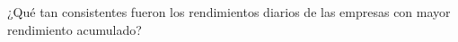 ¿Qué tan consistentes fueron los rendimientos diarios de las empresas con mayor rendimiento acumulado?